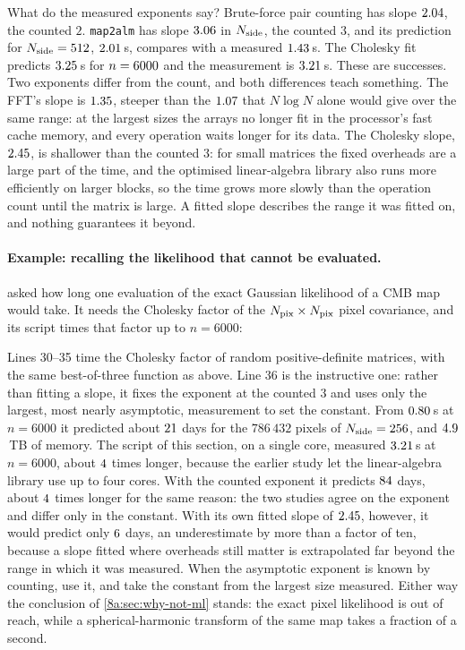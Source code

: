 What do the measured exponents say? Brute-force pair counting has slope $2.04$, the counted $2$. \texttt{map2alm} has slope $3.06$ in $N_{\rm side}$, the counted $3$, and its prediction for $N_{\rm side}=512$, $2.01$\,s, compares with a measured $1.43$\,s. The Cholesky fit predicts $3.25$\,s for $n=6000$ and the measurement is $3.21$\,s. These are successes. Two exponents differ from the count, and both differences teach something. The FFT's slope is $1.35$, steeper than the $1.07$ that $N\log N$ alone would give over the same range: at the largest sizes the arrays no longer fit in the processor's fast cache memory, and every operation waits longer for its data. The Cholesky slope, $2.45$, is shallower than the counted $3$: for small matrices the fixed overheads are a large part of the time, and the optimised linear-algebra library also runs more efficiently on larger blocks, so the time grows more slowly than the operation count until the matrix is large. A fitted slope describes the range it was fitted on, and nothing guarantees it beyond.

\paragraph{Example: recalling the likelihood that cannot be evaluated.}  asked how long one evaluation of the exact Gaussian likelihood of a CMB map would take. It needs the Cholesky factor of the $N_{\rm pix}\times N_{\rm pix}$ pixel covariance, and its script times that factor up to $n=6000$:


Lines 30--35 time the Cholesky factor of random positive-definite matrices, with the same best-of-three function as above. Line 36 is the instructive one: rather than fitting a slope, it fixes the exponent at the counted $3$ and uses only the largest, most nearly asymptotic, measurement to set the constant. From $0.80$\,s at $n=6000$ it predicted about $21$ days for the $786\,432$ pixels of $N_{\rm side}=256$, and $4.9$\,TB of memory. The script of this section, on a single core, measured $3.21$\,s at $n=6000$, about $\TzCholRatio$ times longer, because the earlier study let the linear-algebra library use up to four cores. With the counted exponent it predicts $84$ days, about $\TzDaysRatio$ times longer for the same reason: the two studies agree on the exponent and differ only in the constant. With its own fitted slope of $2.45$, however, it would predict only $6$ days, an underestimate by more than a factor of ten, because a slope fitted where overheads still matter is extrapolated far beyond the range in which it was measured. When the asymptotic exponent is known by counting, use it, and take the constant from the largest size measured. Either way the conclusion of \cref{8a:sec:why-not-ml} stands: the exact pixel likelihood is out of reach, while a spherical-harmonic transform of the same map takes a fraction of a second.

